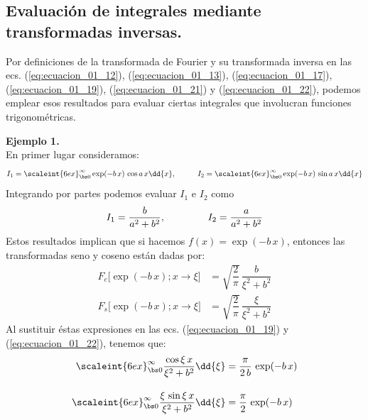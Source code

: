 \subsection{Evaluación de integrales mediante transformadas inversas.}

Por definiciones de la transformada de Fourier y su transformada inversa en las ecs. (\ref{eq:ecuacion_01_12}), (\ref{eq:ecuacion_01_13}), (\ref{eq:ecuacion_01_17}), (\ref{eq:ecuacion_01_19}), (\ref{eq:ecuacion_01_21}) y (\ref{eq:ecuacion_01_22}), podemos emplear esos resultados para evaluar ciertas integrales que involucran funciones trigonométricas. 
\bigskip

\noindent
\textbf{Ejemplo 1.}
\\
En primer lugar consideramos:
\begin{align*}
I_{1} = \scaleint{6ex}_{\bs 0}^{\infty} \exp (-b \, x) \, \cos a \, x \dd{x}, \hspace{1cm} I_{2} = \scaleint{6ex}_{\bs 0}^{\infty} \exp (-b \, x) \, \sin a \, x \dd{x}
\end{align*}
Integrando por partes podemos evaluar $I_{1}$ e $I_{2}$ como
\begin{align*}
I_{1} = \dfrac{b}{a^{2} + b^{2}},  \hspace{1.5cm} I_{2} = \dfrac{a}{a^{2} + b^{2}}
\end{align*}
Estos resultados implican que si hacemos $f(x) = \exp(-b \, x)$, entonces las transformadas seno y coseno están dadas por:
\begin{align*}
F_{c} \big[ \exp(-b \, x); x \to \xi \big] &= \sqrt{\dfrac{2}{\pi}} \, \dfrac{b}{\xi^{2} + b^{2}} \\[0.5em]
F_{s} \big[ \exp(-b \, x); x \to \xi \big] &= \sqrt{\dfrac{2}{\pi}} \, \dfrac{\xi}{\xi^{2} + b^{2}}
\end{align*}
Al sustituir éstas expresiones en las ecs. (\ref{eq:ecuacion_01_19}) y (\ref{eq:ecuacion_01_22}), tenemos que:
\begin{align*}
\scaleint{6ex}_{\bs 0}^{\infty} \dfrac{\cos \xi \, x}{\xi^{2} + b^{2}} \dd{\xi} &= \dfrac{\pi}{2 \, b} \, \exp(-b \, x) \\[1em]
\scaleint{6ex}_{\bs 0}^{\infty} \dfrac{\xi \, \sin \xi \, x}{\xi^{2} + b^{2}} \dd{\xi} &= \dfrac{\pi}{2} \, \exp(-b \, x)
\end{align*}
\bigskip

